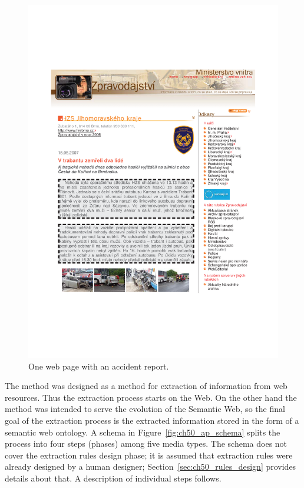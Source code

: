 \begin{figure}
	\centering
		\includegraphics[width=0.5\hsize]{article}
	\caption{One web page with an accident report.}
	\label{fig:ch50_article}
\end{figure}


The method was designed as a method for extraction of information from web resources. Thus the extraction process starts on the Web. On the other hand the method was intended to serve the evolution of the Semantic Web, so the final goal of the extraction process is the extracted information stored in the form of a semantic web ontology. A schema in Figure~\ref{fig:ch50_ap_schema} splits the process into four steps (phases) among five media types. The schema does not cover the extraction rules design phase; it is assumed that extraction rules were already designed by a human designer; Section~\ref{sec:ch50_rules_design} provides details about that. A description of individual steps follows. 



